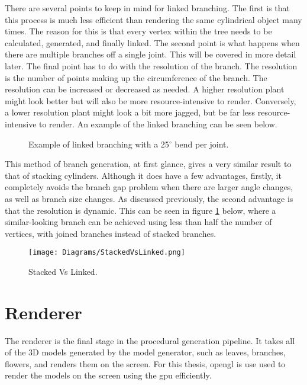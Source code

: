 There are several points to keep in mind for linked branching. The first is that this process is much less efficient than rendering the same cylindrical object many times. The reason for this is that every vertex within the tree needs to be calculated, generated, and finally linked. The second point is what happens when there are multiple branches off a single joint. This will be covered in more detail later. The final point has to do with the resolution of the branch. The resolution is the number of points making up the circumference of the branch. The resolution can be increased or decreased as needed. A higher resolution plant might look better but will also be more resource-intensive to render. Conversely, a lower resolution plant might look a bit more jagged, but be far less resource-intensive to render. An example of the linked branching can be seen below.

\begin{figure}[htbp]
	{\centering
		\vspace{7px}
		\setlength{\fboxrule}{1pt}
		\caption{Example of linked branching with a 25$^{\circ}$ bend per joint.}
	}
\end{figure}
\FloatBarrier

\noindent
This method of branch generation, at first glance, gives a very similar result to that of stacking cylinders. Although it does have a few advantages, firstly, it completely avoids the branch gap problem when there are larger angle changes, as well as branch size changes. As discussed previously, the second advantage is that the resolution is dynamic. This can be seen in figure \ref{stackedvslinked} below, where a similar-looking branch can be achieved using less than half the number of vertices, with joined branches instead of stacked branches.


\begin{figure}[htbp]
	{\centering
		\vspace{7px}
		\texttt{[image: Diagrams/StackedVsLinked.png]}\label{stackedvslinked}
		\caption{Stacked Vs Linked.}
	}
\end{figure}
\FloatBarrier

\section{Renderer}

\noindent
The renderer is the final stage in the procedural generation pipeline. It takes all of the 3D models generated by the model generator, such as leaves, branches, flowers, and renders them on the screen.  For this thesis, \acrshort{opengl} is use used to render the models on the screen using the \acrshort{gpu} efficiently. 

